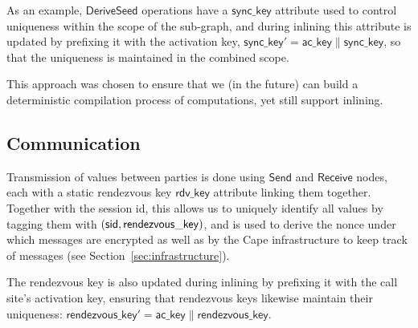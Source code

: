 As an example, $\mathsf{DeriveSeed}$ operations have a $\mathsf{sync\_key}$ attribute used to control uniqueness within the scope of the sub-graph, and during inlining this attribute is updated by prefixing it with the activation key, $\mathsf{sync\_key}' = \mathsf{ac\_key} \| \mathsf{sync\_key}$, so that the uniqueness is maintained in the combined scope.

This approach was chosen to ensure that we (in the future) can build a deterministic compilation process of computations, yet still support inlining.


\subsection{Communication}

Transmission of values between parties is done using $\mathsf{Send}$ and $\mathsf{Receive}$ nodes, each with a static rendezvous key $\mathsf{rdv\_key}$ attribute linking them together. Together with the session id, this allows us to uniquely identify all values by tagging them with $(\mathsf{sid}, \mathsf{rendezvous\_key})$, and is used to derive the nonce under which messages are encrypted as well as by the Cape infrastructure to keep track of messages (see Section~\ref{sec:infrastructure}).

The rendezvous key is also updated during inlining by prefixing it with the call site's activation key, ensuring that rendezvous keys likewise maintain their uniqueness: $\mathsf{rendezvous\_key}' = \mathsf{ac\_key} \| \mathsf{rendezvous\_key}$.
